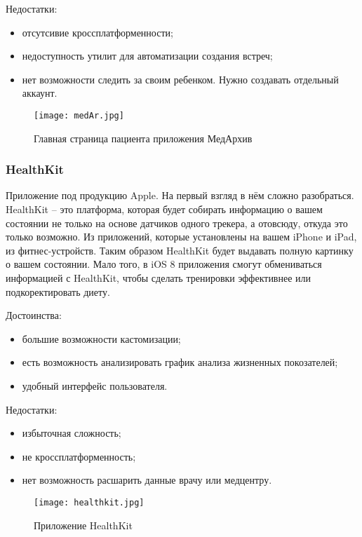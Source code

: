 Недостатки:
\begin{itemize}
  \item отсутсивие кроссплатформенности;
  \item недоступность утилит для автоматизации создания встреч;
  \item нет возможности следить за своим ребенком. Нужно создавать отдельный аккаунт.
\end{itemize}
\begin{figure}[ht]
\centering
  \texttt{[image: medAr.jpg]}  
  \caption{ Главная страница пациента приложения МедАрхив }
  \label{fig:domain:manual_structure:credit_med}
\end{figure}

\subsubsection{HealthKit}

Приложение под продукцию Apple. На первый взгляд в нём сложно разобраться. HealthKit -- это платформа, которая будет собирать информацию о вашем состоянии не только на основе датчиков одного трекера, а отовсюду, откуда это только возможно. Из приложений, которые установлены на вашем iPhone и iPad, из фитнес-устройств. Таким образом HealthKit будет выдавать полную картинку о вашем состоянии. Мало того, в iOS 8 приложения смогут обмениваться информацией с HealthKit, чтобы сделать тренировки эффективнее или подкоректировать диету.

Достоинства:
\begin{itemize}
  \item большие возможности кастомизации;
  \item есть возможность анализировать график анализа жизненных покозателей;
  \item удобный интерфейс пользователя.
\end{itemize}

Недостатки:
\begin{itemize}
  \item избыточная сложность;
  \item не кроссплатформенность;
  \item нет возможность расшарить данные врачу или медцентру.
\end{itemize}

\begin{figure}[ht]
\centering
  \texttt{[image: healthkit.jpg]}  
  \caption{ Приложение HealthKit }
  \label{fig:domain:manual_structure:credit_healthkit}
\end{figure}

